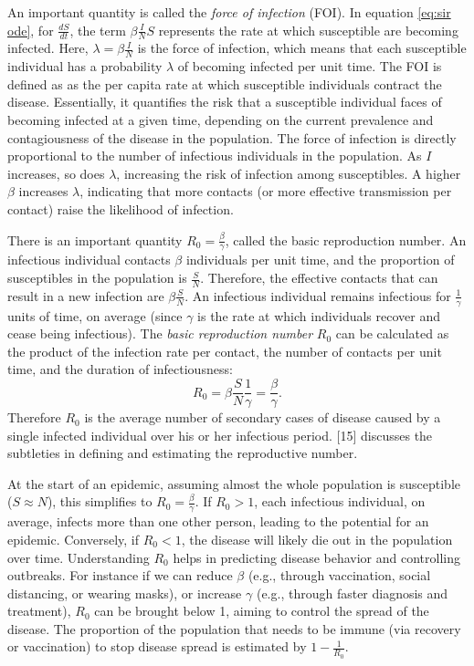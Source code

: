 \documentclass[
11pt, %
oneside, %
english, %
singlespacing, %
]{macthesis} %
\begin{document}
An important quantity is called the \emph{force of infection} (FOI). In equation \ref{eq:sir ode}, for \(\frac{dS}{dt}\), the term \(\beta \frac{I}{N} S\) represents the rate at which susceptible are becoming infected. Here, \(\lambda = \beta \frac{I}{N}\) is the force of infection, which means that each susceptible individual has a probability \(\lambda\) of becoming infected per unit time. The FOI is defined as as the per capita rate at which susceptible individuals contract the disease. Essentially, it quantifies the risk that a susceptible individual faces of becoming infected at a given time, depending on the current prevalence and contagiousness of the disease in the population. The force of infection is directly proportional to the number of infectious individuals in the population. As \(I\) increases, so does \(\lambda\), increasing the risk of infection among susceptibles. A higher \(\beta\) increases \(\lambda\), indicating that more contacts (or more effective transmission per contact) raise the likelihood of infection.

There is an important quantity \(R_0 =  \frac{\beta}{\gamma}\), called the basic reproduction number. An infectious individual contacts \(\beta\) individuals per unit time, and the proportion of susceptibles in the population is \(\frac{S}{N}\). Therefore, the effective contacts that can result in a new infection are \(\beta \frac{S}{N}\). An infectious individual remains infectious for \(\frac{1}{\gamma}\) units of time, on average (since \(\gamma\) is the rate at which individuals recover and cease being infectious). The \emph{basic reproduction number} \(R_0\) can be calculated as the product of the infection rate per contact, the number of contacts per unit time, and the duration of infectiousness:
\[
   R_0 = \beta \frac{S}{N} \frac{1}{\gamma} = \frac{\beta}{\gamma}.
   \]
Therefore \(R_0\) is the average number of secondary cases of disease caused by a single infected individual over his or her infectious period. {[}15{]} discusses the subtleties in defining and estimating the reproductive number.

At the start of an epidemic, assuming almost the whole population is susceptible (\(S \approx N\)), this simplifies to \(R_0 = \frac{\beta}{\gamma}\). If \(R_0 > 1\), each infectious individual, on average, infects more than one other person, leading to the potential for an epidemic. Conversely, if \(R_0 < 1\), the disease will likely die out in the population over time. Understanding \(R_0\) helps in predicting disease behavior and controlling outbreaks. For instance if we can reduce \(\beta\) (e.g., through vaccination, social distancing, or wearing masks), or increase \(\gamma\) (e.g., through faster diagnosis and treatment), \(R_0\) can be brought below 1, aiming to control the spread of the disease. The proportion of the population that needs to be immune (via recovery or vaccination) to stop disease spread is estimated by \(1 - \frac{1}{R_0}\).
\end{document}
